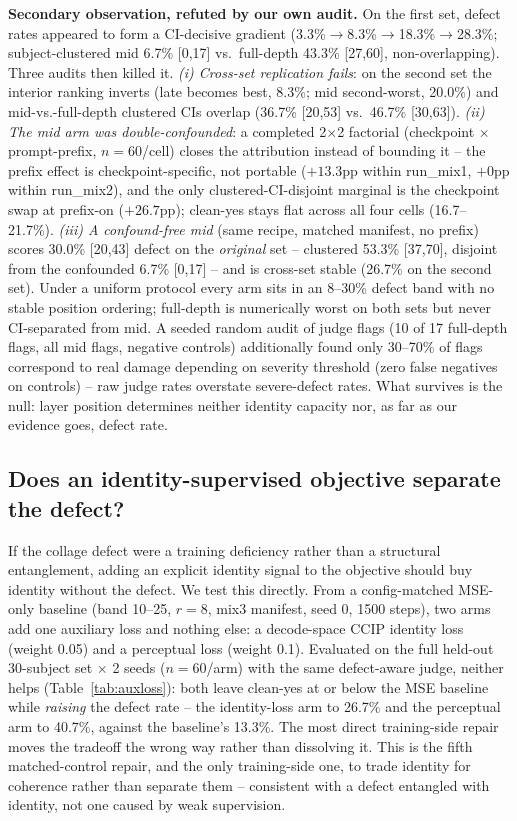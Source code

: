 \textbf{Secondary observation, refuted by our own audit.} On the first
set, defect rates appeared to form a CI-decisive gradient
(3.3\%$\to$8.3\%$\to$18.3\%$\to$28.3\%; subject-clustered mid 6.7\%
[0,17] vs.\ full-depth 43.3\% [27,60], non-overlapping). Three audits
then killed it. \emph{(i) Cross-set replication fails}: on the second
set the interior ranking inverts (late becomes best, 8.3\%; mid
second-worst, 20.0\%) and mid-vs.-full-depth clustered CIs overlap
(36.7\% [20,53] vs.\ 46.7\% [30,63]). \emph{(ii) The mid arm was
double-confounded}: a completed 2$\times$2 factorial (checkpoint
$\times$ prompt-prefix, $n{=}60$/cell) closes the attribution instead
of bounding it -- the prefix effect is checkpoint-specific, not
portable ($+13.3$pp within run\_mix1, $+0$pp within run\_mix2), and the
only clustered-CI-disjoint marginal is the checkpoint swap at
prefix-on ($+26.7$pp); clean-yes stays flat across all four cells
(16.7--21.7\%). \emph{(iii) A confound-free mid} (same recipe,
matched manifest, no prefix) scores 30.0\% [20,43] defect on the
\emph{original} set -- clustered 53.3\% [37,70], disjoint from the
confounded 6.7\% [0,17] -- and is cross-set stable (26.7\% on the
second set). Under a uniform protocol every arm sits in an 8--30\%
defect band with no stable position ordering; full-depth is numerically
worst on both sets but never CI-separated from mid. A seeded random
audit of judge flags (10 of 17 full-depth flags, all mid flags,
negative controls) additionally found only 30--70\% of flags
correspond to real damage depending on severity threshold (zero false
negatives on controls) -- raw judge rates overstate severe-defect
rates. What survives is the null: layer position determines neither
identity capacity nor, as far as our evidence goes, defect rate.

\subsection{Does an identity-supervised objective separate the
defect?}\label{sec:auxloss}

If the collage defect were a training deficiency rather than a
structural entanglement, adding an explicit identity signal to the
objective should buy identity without the defect. We test this directly.
From a config-matched MSE-only baseline (band 10--25, $r{=}8$, mix3
manifest, seed 0, 1500 steps), two arms add one auxiliary loss and
nothing else: a decode-space CCIP identity loss (weight 0.05) and a
perceptual loss (weight 0.1). Evaluated on the full held-out
30-subject set $\times$ 2 seeds ($n{=}60$/arm) with the same
defect-aware judge, neither helps (Table~\ref{tab:auxloss}): both leave
clean-yes at or below the MSE baseline while \emph{raising} the defect
rate -- the identity-loss arm to 26.7\% and the perceptual arm to
40.7\%, against the baseline's 13.3\%. The most direct training-side
repair moves the tradeoff the wrong way rather than dissolving it. This
is the fifth matched-control repair, and the only training-side one, to
trade identity for coherence rather than separate them -- consistent
with a defect entangled with identity, not one caused by weak
supervision.

